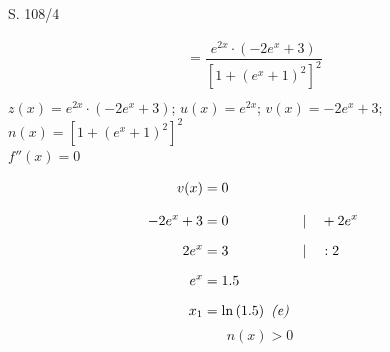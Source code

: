\begin{Exercise}{S. 108/4}{}
\begin{enumerate}
\begin{enumerate}[label=\alph*),leftmargin=*]
{\begin{itemize}[leftmargin=*]
{\begin{align*}
                        &= \dfrac{e^{2x} \cdot \left(-2e^{x} + 3\right)}{\left[1 + \left(e^{x} + 1\right)^{2}\right]^{2}}&&\\[-2.0ex]
                    \end{align*}
                    $z(x) = e^{2x} \cdot \left(-2e^{x} + 3\right)$; \qquad $u(x) =e^{2x}$; \qquad $v(x) = -2e^{x} + 3$; \\[1.0ex]
                    $n(x) = \left[1 + \left(e^{x} + 1\right)^{2}\right]^{2}$\\[1.0ex]
                    $f''(x) = 0$\\[1.0ex]
                    \begin{minipage}[t]{0.4\linewidth}
                        \vspace{-2.0ex}
                        \begin{align*}
                            v(x) &= 0 \\[2.0ex]
                            -2e^{x} + 3 &= 0 &&| \quad + 2e^{x}\\[1.5ex]
                            2e^{x} &= 3 &&| \quad :2\\[1.5ex]
                            e^{x} &= \SI{1.5}{} &&\\[1.5ex]
                            x_{1} &= \ln\left(\SI{1.5}{}\right) \ \text{\textit{(e)}} &&\\[-1.5ex]
                        \end{align*}
                    \end{minipage}
                    \hfill
                    \begin{minipage}[t]{0.55\linewidth}
                        \vspace{-2.0ex}
                        \begin{align*}
                            n(x) > 0
                        \end{align*}
                    \end{minipage}
                    }
\end{itemize}}
\end{enumerate}
\end{enumerate}
\end{Exercise}
